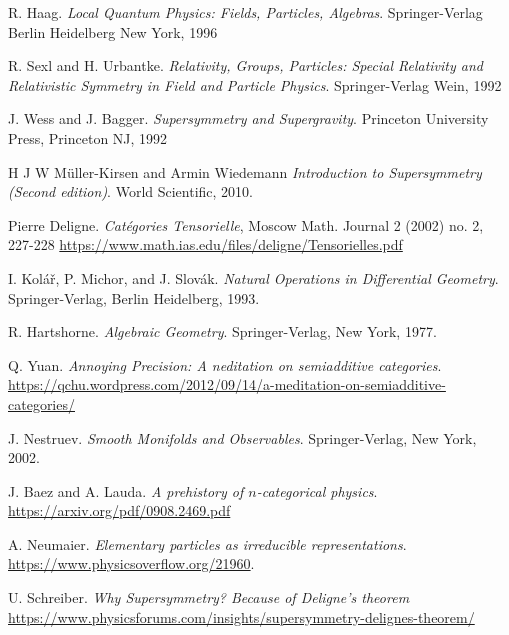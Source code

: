 \documentclass[a4paper,10pt]{scrreprt}
\theoremstyle{definition}
\theoremstyle{plain}
\theoremstyle{remark}
\begin{document}
\begin{thebibliography}{9}
   R. Haag.
    \textit{Local Quantum Physics: Fields, Particles, Algebras}.
    Springer-Verlag Berlin Heidelberg New York, 1996

   R. Sexl and H. Urbantke.
    \textit{Relativity, Groups, Particles: Special Relativity and Relativistic Symmetry in Field and Particle Physics}.
    Springer-Verlag Wein, 1992

   J. Wess and J. Bagger.
    \textit{Supersymmetry and Supergravity}.
    Princeton University Press, Princeton NJ, 1992

   H J W M{\"u}ller-Kirsen and Armin Wiedemann
    \textit{Introduction to Supersymmetry (Second edition)}.
    World Scientific, 2010.

   Pierre Deligne.
    \textit{Cat{\'e}gories Tensorielle},
    Moscow Math. Journal 2 (2002) no. 2, 227-228
    \url{https://www.math.ias.edu/files/deligne/Tensorielles.pdf}

   I. Kol\'{a}\v{r}, P. Michor, and J. Slov\'{a}k.
    \textit{Natural Operations in Differential Geometry}.
    Springer-Verlag, Berlin Heidelberg, 1993.

   R. Hartshorne.
    \textit{Algebraic Geometry}.
    Springer-Verlag, New York, 1977.

   Q. Yuan.
    \textit{Annoying Precision: A neditation on semiadditive categories}.
    \url{https://qchu.wordpress.com/2012/09/14/a-meditation-on-semiadditive-categories/}

   J. Nestruev.
    \textit{Smooth Monifolds and Observables}.
    Springer-Verlag, New York, 2002.

   J. Baez and A. Lauda. 
    \textit{A prehistory of $n$-categorical physics}.
    \url{https://arxiv.org/pdf/0908.2469.pdf}

   A. Neumaier.
    \textit{Elementary particles as irreducible representations}.
    \url{https://www.physicsoverflow.org/21960}.

   U. Schreiber.
    \textit{Why Supersymmetry? Because of Deligne's theorem}
    \url{https://www.physicsforums.com/insights/supersymmetry-delignes-theorem/}


\end{thebibliography}
\end{document}
